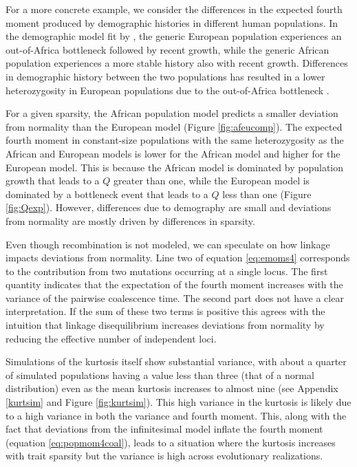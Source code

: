 For a more concrete example, we consider the differences in the expected fourth
moment produced by demographic histories in different human populations. In the
demographic model fit by \citet{Tennessen2012}, the generic European population
experiences an out-of-Africa bottleneck followed by recent growth, while the
generic African population experiences a more stable history also with recent
growth. Differences in demographic history between the two populations has
resulted in a lower heterozygosity in European populations due to the
out-of-Africa bottleneck \citep{Yu2002}.

For a given sparsity, the African population model predicts a smaller deviation
from normality than the European model (Figure \ref{fig:afeucomp}). The expected
fourth moment in constant-size populations with the same heterozygosity as the
African and European models is lower for the African model and higher for the
European model. This is because the African model is dominated by population
growth that leads to a $Q$ greater than one, while the European model is
dominated by a bottleneck event that leads to a $Q$ less than one (Figure
\ref{fig:Qexp}). However, differences due to demography are small and deviations
from normality are mostly driven by differences in sparsity.

Even though recombination is not modeled, we can speculate on how linkage
impacts deviations from normality. Line two of equation \eqref{eq:emoms4}
corresponds to the contribution from two mutations occurring at a single locus.
The first quantity indicates that the expectation of the fourth moment increases
with the variance of the pairwise coalescence time. The second part does not
have a clear interpretation. If the sum of these two terms is positive this
agrees with the intuition that linkage disequilibrium increases deviations from
normality by reducing the effective number of independent loci.

Simulations of the kurtosis itself show substantial variance, with about a
quarter of simulated populations having a value less than three (that of a
normal distribution) even as the mean kurtosis increases to almost nine (see
Appendix \ref{kurtsim} and Figure \ref{fig:kurtsim}). This high variance in the
kurtosis is likely due to a high variance in both the variance and fourth
moment. This, along with the fact that deviations from the infinitesimal model
inflate the fourth moment (equation \eqref{eq:popmom4coal}), leads to a
situation where the kurtosis increases with trait sparsity but the variance is
high across evolutionary realizations.

